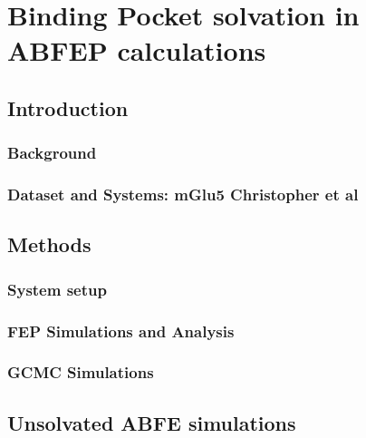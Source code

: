 \chapter{Binding Pocket solvation in ABFEP calculations}
\label{ch:binding-pocket-resolvation}
\section{Introduction}

\lipsum[1][1-3]

\subsection{Background}

\lipsum[1][1-3]

\subsection{Dataset and Systems: mGlu5 Christopher et al}

\lipsum[1][1-3]

\section{Methods}

\lipsum[1][1-3]

\subsection{System setup}

\lipsum[1][1-3]

\subsection{FEP Simulations and Analysis}

\lipsum[1][1-3]

\subsection{GCMC Simulations}

\lipsum[1][1-3]

\section{Unsolvated ABFE simulations}

\lipsum[1][1-3]

